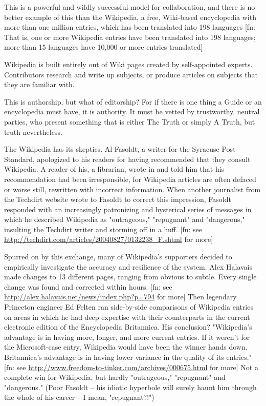 This is a powerful and wildly successful model for collaboration,
and there is no better example of this than the Wikipedia, a free,
Wiki-based encyclopedia with more than one million entries, which
has been translated into 198 languages [fn: That is, one or more
Wikipedia entries have been translated into 198 languages; more
than 15 languages have 10,000 or more entries translated]

Wikipedia is built entirely out of Wiki pages created by
self-appointed experts. Contributors research and write up
subjects, or produce articles on subjects that they are familiar
with.

This is authorship, but what of editorship? For if there is one
thing a Guide or an encyclopedia must have, it is authority. It
must be vetted by trustworthy, neutral parties, who present
something that is either The Truth or simply A Truth, but truth
nevertheless.

The Wikipedia has its skeptics. Al Fasoldt, a writer for the
Syracuse Post-Standard, apologized to his readers for having
recommended that they consult Wikipedia. A reader of his, a
librarian, wrote in and told him that his recommendation had been
irresponsible, for Wikipedia articles are often defaced or worse
still, rewritten with incorrect information. When another
journalist from the Techdirt website wrote to Fasoldt to correct
this impression, Fasoldt responded with an increasingly patronizing
and hysterical series of messages in which he described Wikipedia
as "outrageous," "repugnant" and "dangerous," insulting the
Techdirt writer and storming off in a huff. [fn: see
\href{http://techdirt.com/articles/20040827/0132238_F.shtml}{http://techdirt.com/articles/20040827/0132238\_F.shtml}
for more]

Spurred on by this exchange, many of Wikipedia's supporters decided
to empirically investigate the accuracy and resilience of the
system. Alex Halavais made changes to 13 different pages, ranging
from obvious to subtle. Every single change was found and corrected
within hours. [fn: see
\href{http://alex.halavais.net/news/index.php?p=794}{http://alex.halavais.net/news/index.php?p=794}
for more] Then legendary Princeton engineer Ed Felten ran
side-by-side comparisons of Wikipedia entries on areas in which he
had deep expertise with their counterparts in the current
electronic edition of the Encyclopedia Britannica. His conclusion?
"Wikipedia's advantage is in having more, longer, and more current
entries. If it weren't for the Microsoft-case entry, Wikipedia
would have been the winner hands down. Britannica's advantage is in
having lower variance in the quality of its entries." [fn: see
\href{http://www.freedom-to-tinker.com/archives/000675.html}{http://www.freedom-to-tinker.com/archives/000675.html}
for more] Not a complete win for Wikipedia, but hardly
"outrageous," "repugnant" and "dangerous." (Poor Fasoldt -- his
idiotic hyperbole will surely haunt him through the whole of his
career -- I mean, "repugnant?!")

